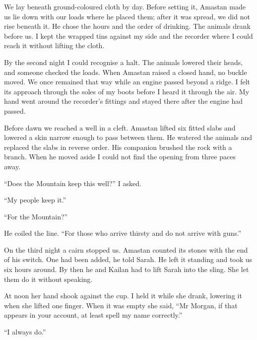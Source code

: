 We lay beneath ground-coloured cloth by day. Before setting it, Amastan made us lie down with our loads where he placed them; after it was spread, we did not rise beneath it. He chose the hours and the order of drinking. The animals drank before us. I kept the wrapped tins against my side and the recorder where I could reach it without lifting the cloth.\par

By the second night I could recognise a halt. The animals lowered their heads, and someone checked the loads. When Amastan raised a closed hand, no buckle moved. We once remained that way while an engine passed beyond a ridge. I felt its approach through the soles of my boots before I heard it through the air. My hand went around the recorder's fittings and stayed there after the engine had passed.\par

Before dawn we reached a well in a cleft. Amastan lifted six fitted slabs and lowered a skin narrow enough to pass between them. He watered the animals and replaced the slabs in reverse order. His companion brushed the rock with a branch. When he moved aside I could not find the opening from three paces away.\par

``Does the Mountain keep this well?'' I asked.\par

``My people keep it.''\par

``For the Mountain?''\par

He coiled the line. ``For those who arrive thirsty and do not arrive with guns.''\par

On the third night a cairn stopped us. Amastan counted its stones with the end of his switch. One had been added, he told Sarah. He left it standing and took us six hours around. By then he and Kailan had to lift Sarah into the sling. She let them do it without speaking.\par

At noon her hand shook against the cup. I held it while she drank, lowering it when she lifted one finger. When it was empty she said, ``Mr Morgan, if that appears in your account, at least spell my name correctly.''\par

``I always do.''\par

